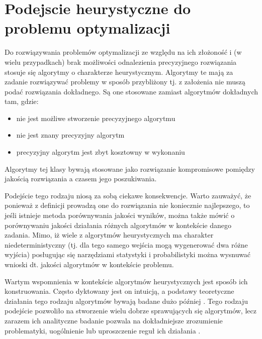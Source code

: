 \documentclass[12pt,a4paper]{report}
\begin{document}
{\section{Podejscie heurystyczne do problemu optymalizacji}
\label{OptHeur}
\par{
Do rozwiązywania problemów optymalizacji ze względu na ich złożoność i (w wielu przypadkach) brak możliwości odnalezienia precyzyjnego rozwiązania stosuje się algorytmy o charakterze heurystycznym. Algorytmy te mają za zadanie rozwiązywać problemy w sposób przybliżony tj. z założenia nie muszą podać rozwiązania dokładnego. Są one stosowane zamiast algorytmów dokładnych tam, gdzie: 
\begin{itemize}
\item nie jest możliwe stworzenie precyzyjnego algorytmu
\item nie jest znany precyzyjny algorytm
\item precyzyjny algorytm jest zbyt kosztowny w wykonaniu
\end{itemize}
}
\par{
Algorytmy tej klasy bywają stosowane jako rozwiązanie kompromisowe pomiędzy jakością rozwiązania a czasem jego poszukiwania.
}
\par{
Podejście tego rodzaju niosą za sobą ciekawe konsekwencje. Warto zauważyć, że ponieważ z definicji prowadzą one do rozwiązania nie koniecznie najlepszego, to jeśli istnieje metoda porównywania jakości wyników, można także mówić o porównywaniu jakości działania różnych algorytmów w kontekście danego zadania. Mimo, iż wiele z algorytmów heurystycznych ma charakter niedeterministyczny (tj. dla tego samego wejścia mogą wygenerować dwa różne wyjścia) posługując się narzędziami statystyki i probabilistyki można wysnuwać wnioski dt. jakości algorytmów w kontekście problemu.
}
\par{
Wartym wspomnienia w kontekście algorytmów heurystycznych jest sposób ich konstruowania. Często dyktowany jest on intuicją, a podstawy teoretyczne działania tego rodzaju algorytmów bywają badane dużo później \cite{Opara}. Tego rodzaju podejście pozwoliło na stworzenie wielu dobrze sprawujących się algorytmów, lecz zarazem ich analityczne badanie pozwala na dokładniejsze zrozumienie problematyki, uogólnienie lub uproszczenie reguł ich działania \cite{Opara}.
}
\newpage
}
\end{document}
